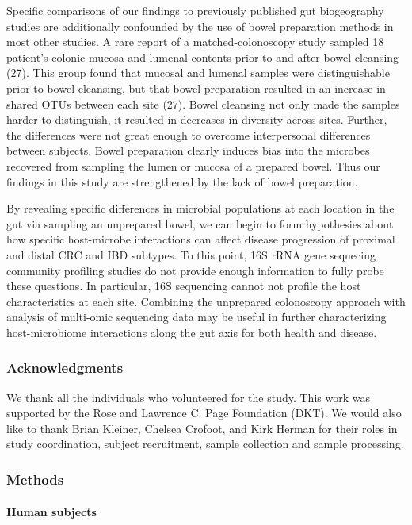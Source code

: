 \documentclass[11pt,]{article}
\let\oldparagraph\paragraph
\renewcommand{\paragraph}[1]{\oldparagraph{#1}\mbox{}}
\begin{document}
Specific comparisons of our findings to previously published gut
biogeography studies are additionally confounded by the use of bowel
preparation methods in most other studies. A rare report of a
matched-colonoscopy study sampled 18 patient's colonic mucosa and
lumenal contents prior to and after bowel cleansing (27). This group
found that mucosal and lumenal samples were distinguishable prior to
bowel cleansing, but that bowel preparation resulted in an increase in
shared OTUs between each site (27). Bowel cleansing not only made the
samples harder to distinguish, it resulted in decreases in diversity
across sites. Further, the differences were not great enough to overcome
interpersonal differences between subjects. Bowel preparation clearly
induces bias into the microbes recovered from sampling the lumen or
mucosa of a prepared bowel. Thus our findings in this study are
strengthened by the lack of bowel preparation.

By revealing specific differences in microbial populations at each
location in the gut via sampling an unprepared bowel, we can begin to
form hypothesies about how specific host-microbe interactions can affect
disease progression of proximal and distal CRC and IBD subtypes. To this
point, 16S rRNA gene sequecing community profiling studies do not
provide enough information to fully probe these questions. In
particular, 16S sequencing cannot not profile the host characteristics
at each site. Combining the unprepared colonoscopy approach with
analysis of multi-omic sequencing data may be useful in further
characterizing host-microbiome interactions along the gut axis for both
health and disease.

\subsubsection{Acknowledgments}\label{acknowledgments}

We thank all the individuals who volunteered for the study. This work
was supported by the Rose and Lawrence C. Page Foundation (DKT). We
would also like to thank Brian Kleiner, Chelsea Crofoot, and Kirk Herman
for their roles in study coordination, subject recruitment, sample
collection and sample processing.

\subsubsection{Methods}\label{methods}

\paragraph{Human subjects}\label{human-subjects}
\end{document}
